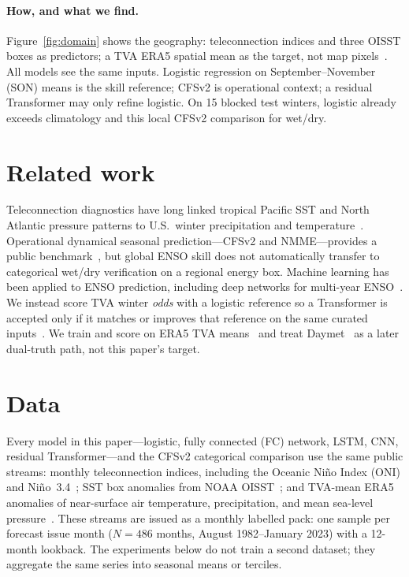 \documentclass{article}
\begin{document}
\paragraph{How, and what we find.}
Figure~\ref{fig:domain} shows the geography: teleconnection indices and three OISST boxes as predictors; a TVA ERA5 spatial mean as the target, not map pixels~\citep{cpc-oni,barnston1997nino34,huang2021oisst,hersbach2020era5}.
All models see the same inputs.
Logistic regression on September--November (SON) means is the skill reference; CFSv2 is operational context; a residual Transformer may only refine logistic.
On 15 blocked test winters, logistic already exceeds climatology and this local CFSv2 comparison for wet/dry.

\section{Related work}

Teleconnection diagnostics have long linked tropical Pacific SST and North Atlantic pressure patterns to U.S.\ winter precipitation and temperature~\citep{ropelewski1986enso,kurtzman2007enso,hurrell1995nao,thompson1998ao}. Operational dynamical seasonal prediction---CFSv2 and NMME---provides a public benchmark~\citep{saha2014cfsv2,kirtman2014nmme,barnston2012cfsv2}, but global ENSO skill does not automatically transfer to categorical wet/dry verification on a regional energy box. Machine learning has been applied to ENSO prediction, including deep networks for multi-year ENSO~\citep{ham2019enso}. We instead score TVA winter \emph{odds} with a logistic reference so a Transformer is accepted only if it matches or improves that reference on the same curated inputs~\citep{heidke1926,brier1950,wilks2011}. We train and score on ERA5 TVA means~\citep{hersbach2020era5} and treat Daymet~\citep{thornton2021daymet} as a later dual-truth path, not this paper's target.

\section{Data}

Every model in this paper---logistic, fully connected (FC) network, LSTM, CNN, residual Transformer---and the CFSv2 categorical comparison use the same public streams: monthly teleconnection indices, including the Oceanic Ni\~{n}o Index (ONI) and Ni\~{n}o~3.4~\citep{cpc-oni,barnston1997nino34}; SST box anomalies from NOAA OISST~\citep{huang2021oisst}; and TVA-mean ERA5 anomalies of near-surface air temperature, precipitation, and mean sea-level pressure~\citep{hersbach2020era5}. These streams are issued as a monthly labelled pack: one sample per forecast issue month (\(N{=}486\) months, August 1982--January 2023) with a 12-month lookback. The experiments below do not train a second dataset; they aggregate the same series into seasonal means or terciles.
\end{document}
